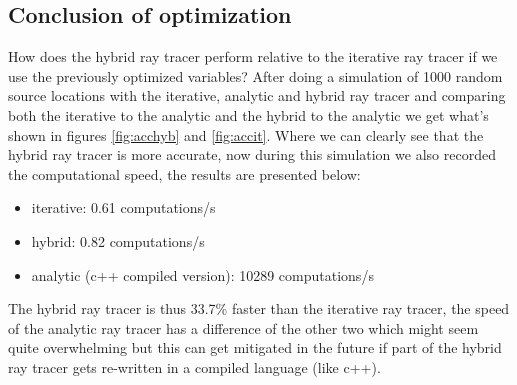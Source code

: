 \subsection{Conclusion of optimization}
How does the hybrid ray tracer perform relative to the iterative ray tracer if we use 
the previously optimized variables? After doing a simulation of 1000 random source locations with
the iterative, analytic and hybrid ray tracer and comparing both the iterative to the analytic and the hybrid to the analytic
we get what's shown in figures \ref{fig:acchyb} and \ref{fig:accit}. Where we can clearly see that the hybrid
ray tracer is more accurate, now during this simulation we also recorded the computational speed, the results
are presented below:
\begin{itemize}
	\item iterative: 0.61 computations/s
	\item hybrid: 0.82 computations/s
	\item analytic (c++ compiled version): 10289 computations/s
\end{itemize}
The hybrid ray tracer is thus 33.7\% faster than the iterative ray tracer, the speed of the analytic ray tracer
has a difference of the other two which might seem quite overwhelming but this can get mitigated in the future if 
part of the hybrid ray tracer gets re-written in a compiled language (like c++).


